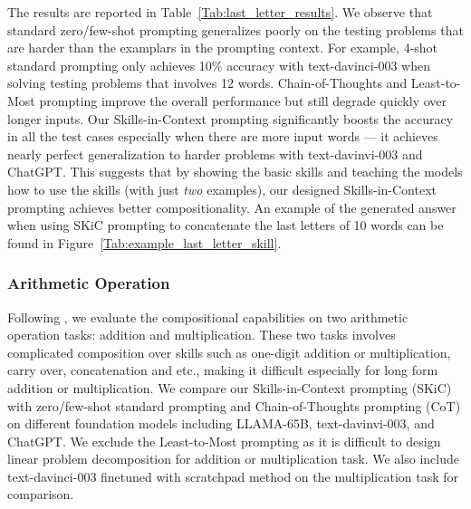 The results are reported in Table~\ref{Tab:last_letter_results}. We observe that standard zero/few-shot prompting generalizes poorly on the testing problems that are harder than the examplars in the prompting context. For example, 4-shot standard prompting only achieves 10\% accuracy with text-davinci-003 when solving testing problems that involves 12 words. Chain-of-Thoughts and Least-to-Most prompting improve the overall performance but still degrade quickly over longer inputs. Our Skills-in-Context prompting  significantly boosts the accuracy in all the test cases especially when there are more input words --- it achieves nearly perfect generalization to harder problems with text-davinvi-003 and ChatGPT. This suggests that by showing the basic skills and teaching the models how to use the skills (with just \emph{two} examples), our designed Skills-in-Context prompting achieves better compositionality. An example of the generated answer when using SKiC prompting to concatenate the last letters of 10 words can be found in Figure~\ref{Tab:example_last_letter_skill}.



\subsubsection{Arithmetic Operation}
Following \citeauthor{dziri2023faith}, we evaluate the compositional capabilities on two arithmetic operation tasks: addition and multiplication. These two tasks involves complicated composition over skills such as one-digit addition or multiplication, carry over, concatenation and etc.\citep{dziri2023faith}, making it difficult especially for long form addition or multiplication. We compare our Skills-in-Context prompting (SKiC) with zero/few-shot standard prompting \citep{brown2020language} and Chain-of-Thoughts prompting (CoT) \citep{wei2022chain} on different foundation models including LLAMA-65B, text-davinvi-003, and ChatGPT. We exclude the Least-to-Most prompting \citep{zhou2022least} as it is difficult to design linear problem decomposition for addition or multiplication task. We also include text-davinci-003 finetuned with scratchpad method \citep{nye2021show,dziri2023faith} on the multiplication task for comparison.


